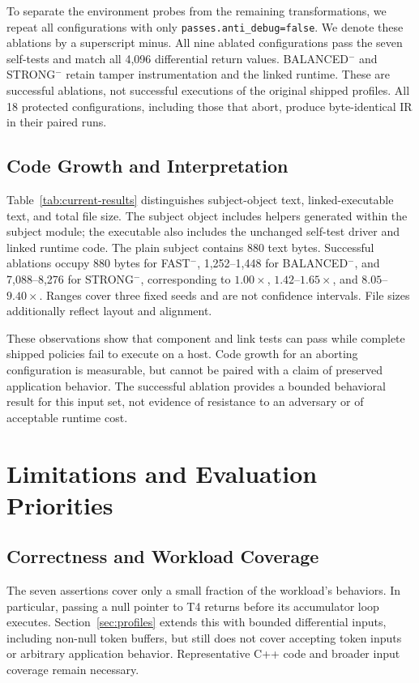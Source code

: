 \documentclass[conference]{IEEEtran}
\begin{document}
To separate the environment probes from the remaining transformations,
we repeat all configurations with only
\texttt{passes.anti\_debug=false}. We denote these ablations by a superscript
minus. All nine ablated configurations pass the seven self-tests and match
all 4,096 differential return values. BALANCED$^{-}$ and STRONG$^{-}$
retain tamper instrumentation and the linked runtime. These are successful
ablations, not successful executions of the original shipped profiles.
All 18 protected configurations, including those that abort, produce
byte-identical IR in their paired runs.



\subsection{Code Growth and Interpretation}

Table~\ref{tab:current-results} distinguishes subject-object text,
linked-executable text, and total file size. The subject object includes
helpers generated within the subject module; the executable also includes
the unchanged self-test driver and linked runtime code. The plain subject
contains 880 text bytes. Successful ablations occupy 880 bytes for FAST$^{-}$,
1,252--1,448 for BALANCED$^{-}$, and 7,088--8,276 for STRONG$^{-}$,
corresponding to $1.00\times$, $1.42$--$1.65\times$, and
$8.05$--$9.40\times$. Ranges cover three fixed seeds and are not confidence
intervals. File sizes additionally reflect layout and alignment.

These observations show that component and link tests can pass while
complete shipped policies fail to execute on a host. Code growth for an
aborting configuration is measurable, but cannot be paired with a claim
of preserved application behavior. The successful ablation provides a
bounded behavioral result for this input set, not evidence of resistance
to an adversary or of acceptable runtime cost.

\section{Limitations and Evaluation Priorities}
\label{sec:limits}

\subsection{Correctness and Workload Coverage}

The seven assertions cover only a small fraction of the workload's
behaviors. In particular, passing a null pointer to T4 returns before
its accumulator loop executes. Section~\ref{sec:profiles} extends this with bounded differential inputs,
including non-null token buffers, but still does not cover accepting token
inputs or arbitrary application behavior. Representative C++ code and
broader input coverage remain necessary.
\end{document}
